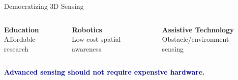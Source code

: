\documentclass[aspectratio=169]{beamer}
\begin{document}
\begin{frame}{Democratizing 3D Sensing}
    \vspace{1cm}
    \begin{columns}[t]
        \begin{center}
            {\Large \bfseries \textcolor{accent}{Education}} \\[0.8cm]
            \large Affordable research
        \end{center}
        \begin{center}
            {\Large \bfseries \textcolor{accent}{Robotics}} \\[0.8cm]
            \large Low-cost spatial awareness
        \end{center}
        \begin{center}
            {\Large \bfseries \textcolor{accent}{Assistive Technology}} \\[0.8cm]
            \large Obstacle/environment sensing
        \end{center}
    \end{columns}
    \vspace{2.5cm}
    \begin{center}
        {\LARGE \bfseries \textcolor{navy}{Advanced sensing should not require expensive hardware.}}
    \end{center}
\end{frame}

\end{document}
